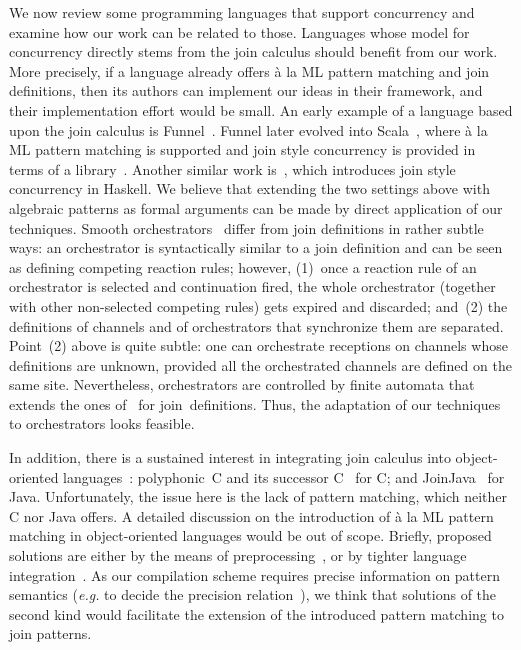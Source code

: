 \documentclass{LMCS}
\makeatletter
\newcommand{\eg}{\emph{e.g.}\@\xspace}
\newcommand{\csharp}{C\xspace}
\newcommand{\haskell}{\textrm{Haskell}\xspace}
\newcommand{\comega}{C\xspace}
\newcommand{\funnel}{\textrm{Funnel}\xspace}
\newcommand{\scala}{\textrm{Scala}\xspace}
\newcommand{\java}{\textrm{Java}\xspace}
\newcommand{\joinjava}{\textrm{JoinJava}\xspace}
\renewcommand{\_}{\mathord{\rule[-.25ex]{1ex}{.15ex}}}
\makeatother
\begin{document}
We now review some programming languages that support concurrency and
examine how our work can be related to those. Languages whose model
for concurrency directly stems from the join calculus should benefit
from our work. More precisely, if a language already offers \`{a} la
ML pattern matching and join definitions, then its authors can
implement our ideas in their framework, and their implementation
effort would be small. An early example of a language based upon the
join calculus is \funnel~\cite{funnel}. \funnel later evolved into
\scala~\cite{Odersky:scala}, where \`{a} la ML pattern matching is
supported and join style concurrency is provided in terms of a
library~\cite{JoinScala}. Another similar work is~\cite{Singh06},
which introduces join style concurrency in \haskell. We believe that
extending the two settings above
with algebraic patterns as formal arguments
can be made by direct application of our techniques.
Smooth orchestrators~\cite{Orchestrators} differ from join definitions
in rather subtle ways: an orchestrator is syntactically similar to a
join definition and can be seen as defining competing reaction rules;
however, (1)~once a reaction rule of an orchestrator is selected and
continuation fired, the whole orchestrator (together with other
non-selected competing rules) gets expired and discarded; and~(2) the
definitions of channels and of orchestrators that synchronize them are
separated.
Point~(2) above is quite subtle: one can orchestrate receptions
on channels whose definitions are unknown, provided
all the orchestrated channels are defined on the same site.
Nevertheless,
orchestrators are controlled by finite automata that extends the ones
of~\cite{LeFessantMarangetCompileJoin} for join~definitions.  Thus,
the adaptation of our techniques to orchestrators looks feasible.

In addition, there is a sustained interest in integrating join
calculus into object-oriented languages~: polyphonic~\csharp and its
successor \comega~\cite{Cw} for \csharp; and \joinjava~\cite{JoinJava}
for \java. Unfortunately, the issue here is the lack of pattern
matching, which neither \csharp nor \java offers.  A detailed
discussion on the introduction of \`{a} la ML pattern matching in
object-oriented languages would be out of scope.  Briefly, proposed
solutions are either by the means of preprocessing~\cite{TOM}, or by
tighter language integration~\cite{Odersky:scala,OOMatch}. As our
compilation scheme requires precise information on pattern semantics
(\eg to decide the precision relation~), we think
that solutions of the second kind would facilitate the extension of
the introduced pattern matching to join patterns.
\end{document}
